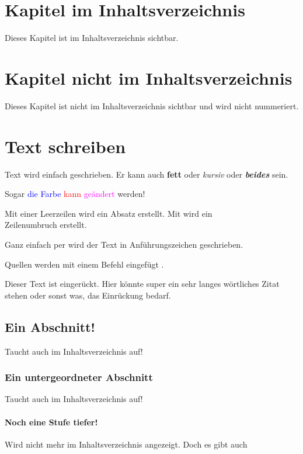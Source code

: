 \chapter{Kapitel im Inhaltsverzeichnis}
Dieses Kapitel ist im Inhaltsverzeichnis sichtbar.

\chapter*{Kapitel nicht im Inhaltsverzeichnis}
Dieses Kapitel ist nicht im Inhaltsverzeichnis sichtbar und wird nicht nummeriert.

\chapter{Text schreiben}
Text wird einfach geschrieben.
Er kann auch \textbf{fett} oder \textit{kursiv} oder \textit{\textbf{beides}} sein.

Sogar \textcolor{blue}{die Farbe} \textcolor{red}{kann} \textcolor{magenta}{geändert} werden!

Mit einer Leerzeilen wird ein Absatz erstellt.
Mit \anfz{\textbackslash\textbackslash} wird ein\\
Zeilenumbruch erstellt.

Ganz einfach per  wird der Text in Anführungszeichen geschrieben.

Quellen werden mit einem  Befehl eingefügt \cite{Tietze2010}.

\begin{addmargin}[2em]{0pt}
    Dieser Text ist eingerückt. Hier könnte super ein sehr langes wörtliches Zitat stehen oder sonst was, das Einrückung bedarf.
\end{addmargin}

\section{Ein Abschnitt!}
Taucht auch im Inhaltsverzeichnis auf!
\subsection{Ein untergeordneter Abschnitt}
Taucht auch im Inhaltsverzeichnis auf!
\subsubsection{Noch eine Stufe tiefer!}
Wird nicht mehr im Inhaltsverzeichnis angezeigt.
Doch es gibt auch

